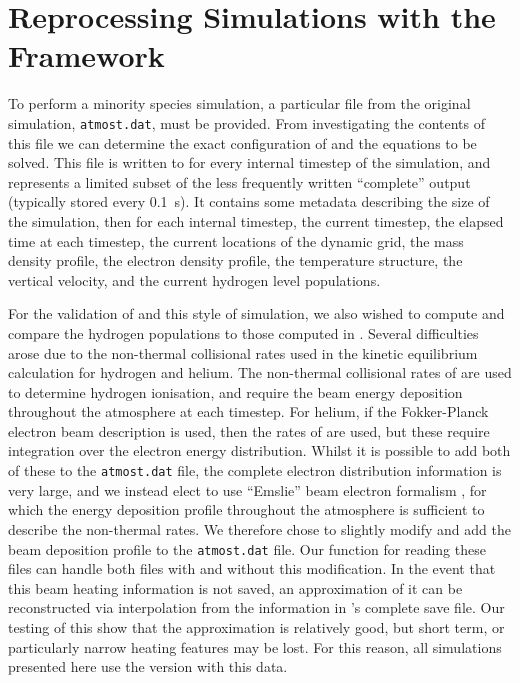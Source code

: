 \section{Reprocessing \Radyn{} Simulations with the \Lw{} Framework}

To perform a minority species simulation, a particular file from the original simulation, \texttt{atmost.dat}, must be provided.
From investigating the contents of this file we can determine the exact configuration of \Lw{} and the equations to be solved.
This file is written to for every internal timestep of the \Radyn{} simulation, and represents a limited subset of the less frequently written ``complete'' output (typically stored every \SI{0.1}{\second}).
It contains some metadata describing the size of the simulation, then for each internal timestep, the current timestep, the elapsed time at each timestep, the current locations of the dynamic grid, the mass density profile, the electron density profile, the temperature structure, the vertical velocity, and the current hydrogen level populations.

For the validation of \Lw{} and this style of simulation, we also wished to compute and compare the hydrogen populations to those computed in \Radyn{}.
Several difficulties arose due to the non-thermal collisional rates used in the kinetic equilibrium calculation for hydrogen and helium.
The non-thermal collisional rates of \citet{1993Fang} are used to determine hydrogen ionisation, and require the beam energy deposition throughout the atmosphere at each timestep.
For helium, if the Fokker-Planck electron beam description is used, then the rates of \citet{Arnaud1985} are used, but these require integration over the electron energy distribution.
Whilst it is possible to add both of these to the \texttt{atmost.dat} file, the complete electron distribution information is very large, and we instead elect to use ``Emslie'' beam electron formalism \citep{Emslie1978}, for which the energy deposition profile throughout the atmosphere is sufficient to describe the non-thermal rates.
We therefore chose to slightly modify \Radyn{} and add the beam deposition profile to the \texttt{atmost.dat} file.
Our function for reading these files can handle both files with and without this modification.
In the event that this beam heating information is not saved, an approximation of it can be reconstructed via interpolation from the information in \Radyn{}'s complete save file.
Our testing of this show that the approximation is relatively good, but short term, or particularly narrow heating features may be lost.
For this reason, all simulations presented here use the version with this data.

